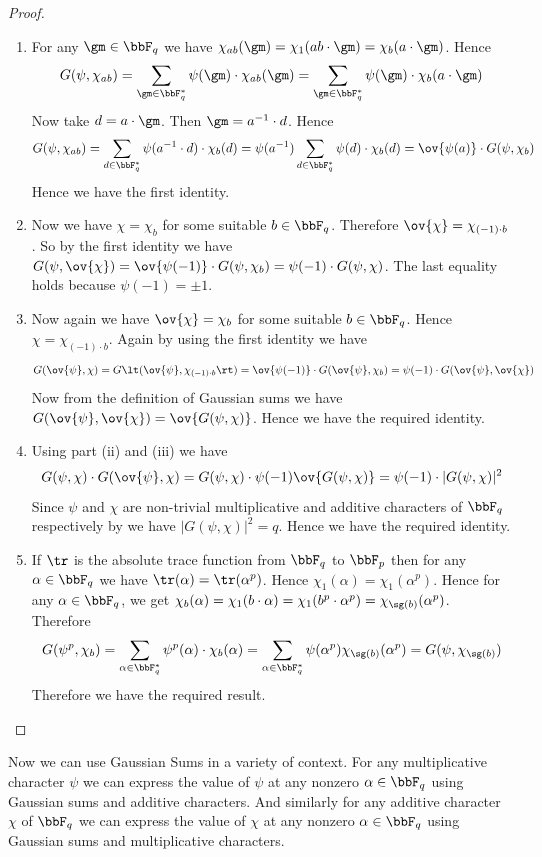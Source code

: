 \begin{proof}
  \begin{enumerate}[label=(\roman*)]
    \item For any $\gm\in\bbF_q$ we have $\chi_{ab}(\gm)=\chi_1(ab\cdot \gm)=\chi_b(a\cdot \gm)$. Hence $$G(\psi,\chi_{ab})=\sum_{\gm\in\bbF_q^*}\psi(\gm)\cdot \chi_{ab}(\gm)=\sum_{\gm\in\bbF_q^*}\psi(\gm)\cdot \chi_b(a\cdot \gm)$$Now take $d=a\cdot \gm$. Then $\gm=a^{-1}\cdot d$. Hence $$G(\psi,\chi_{ab})=\sum_{d\in\bbF_q^*}\psi(a^{-1}\cdot d)\cdot \chi_b(d)=\psi(a^{-1})\sum_{d\in\bbF_q^*}\psi(d)\cdot \chi_b(d)=\ov{\psi(a)}\cdot G(\psi,\chi_b)$$Hence we have the first identity.
    \item Now we have $\chi=\chi_b$ for some suitable $b\in \bbF_q$. Therefore $\ov{\chi}=\chi_{(-1)\cdot b}$. So by the first identity we have $G(\psi,\ov{\chi})=\ov{\psi(-1)}\cdot G(\psi,\chi_b)=\psi(-1)\cdot G(\psi,\chi)$. The last equality holds because $\psi(-1)=\pm 1$.
    \item Now again we have $\ov{\chi}=\chi_b$ for some suitable $b\in \bbF_q$. Hence $\chi=\chi_{(-1)\cdot b}$. Again by using the first identity we have $$G(\ov{\psi},\chi)=G\lt(\ov{\psi},\chi_{(-1)\cdot b}\rt)=\ov{\psi(-1)}\cdot G(\ov{\psi},\chi_b)=\psi(-1)\cdot G(\ov{\psi},\ov{\chi})$$Now from the definition of Gaussian sums we have $G(\ov{\psi},\ov{\chi})=\ov{G(\psi,\chi)}$. Hence we have the required identity.
    \item Using part (ii) and (iii) we have $$G(\psi,\chi)\cdot G(\ov{\psi},\chi)=G(\psi,\chi)\cdot \psi(-1)\ov{G(\psi,\chi)}=\psi(-1)\cdot |G(\psi,\chi)|^2$$Since $\psi$ and $\chi$ are non-trivial multiplicative and additive characters of $\bbF_q$ respectively by  we have $|G(\psi,\chi)|^2=q$. Hence we have the required identity.
    \item If $\tr$ is the absolute trace function from $\bbF_q$ to $\bbF_p$ then for any $\alpha\in\bbF_q$ we have $\tr(\alpha)=\tr(\alpha^p)$. Hence $\chi_1(\alpha)=\chi_1(\alpha^p)$. Hence for any $\alpha\in \bbF_q$, we get $\chi_b(\alpha)=\chi_1(b\cdot \alpha)=\chi_1(b^p\cdot \alpha^p)=\chi_{\sg(b)}(\alpha^p)$. Therefore $$G(\psi^p,\chi_b)=\sum_{\alpha\in\bbF_q^*}\psi^p(\alpha)\cdot \chi_b(\alpha)=\sum_{\alpha\in\bbF_q^*}\psi(\alpha^p)\chi_{\sg(b)}(\alpha^p)=G(\psi,\chi_{\sg(b)})$$Therefore  we have the required result.
  \end{enumerate}
\end{proof}

Now we can use Gaussian Sums in a variety of context. For any multiplicative character $\psi$ we can express the value of $\psi$ at any nonzero $\alpha\in\bbF_q$ using Gaussian sums and additive characters. And similarly for any additive character $\chi$ of $\bbF_q$ we can express the value of $\chi$ at any nonzero $\alpha\in\bbF_q$ using Gaussian sums and multiplicative characters.

